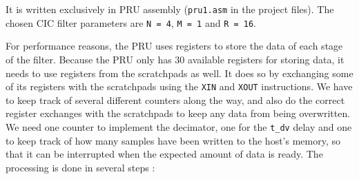 \documentclass[]{report}
\begin{document}
It is written exclusively in PRU assembly (\texttt{pru1.asm} in the project files). The chosen CIC filter parameters are \texttt{N~=~4}, \texttt{M = 1} and \texttt{R = 16}.

For performance reasons, the PRU uses registers to store the data of each stage of the filter. Because the PRU only has 30 available registers for storing data, it needs to use registers from the scratchpads as well. It does so by exchanging some of its registers with the scratchpads using the \texttt{XIN} and \texttt{XOUT} instructions. We have to keep track of several different counters along the way, and also do the correct register exchanges with the scratchpads to keep any data from being overwritten. We need one counter to implement the decimator, one for the \texttt{t\_dv} delay and one to keep track of how many samples have been written to the host's memory, so that it can be interrupted when the expected amount of data is ready. The processing is done in several steps :
\end{document}
